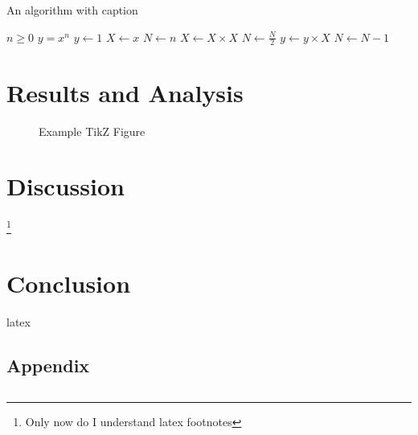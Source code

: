 \documentclass[12pt, a4paper]{report}
\begin{document}
\begin{algorithm}
\caption{An algorithm with caption}\label{alg:cap}
\begin{algorithmic}
\Require $n \geq 0$
\Ensure $y = x^n$
\State $y \gets 1$
\State $X \gets x$
\State $N \gets n$
    \State $X \gets X \times X$
    \State $N \gets \frac{N}{2}$  
    \State $y \gets y \times X$
    \State $N \gets N - 1$
\EndIf
\EndWhile
\end{algorithmic}
\end{algorithm}

\chapter{Results and Analysis}
\label{Chap4}
\lipsum[1-4]
\begin{figure}
    \centering
{}
\caption{Example TikZ Figure}
\end{figure}
\chapter{Discussion}
\label{Chap5}
\lipsum[9-10]
\footnote{Only now do I understand latex footnotes}

\chapter{Conclusion}
\label{Chap6}
\Gls{latex} 
\renewcommand{\bibname}{References}



\begin{appendices}
\chapter{Appendix}
\begin{lstlisting}[language = Matlab, caption= Listing Example]
%Put code here
\end{lstlisting}
\end{appendices}

\clearpage
\printglossaries

\end{document}
